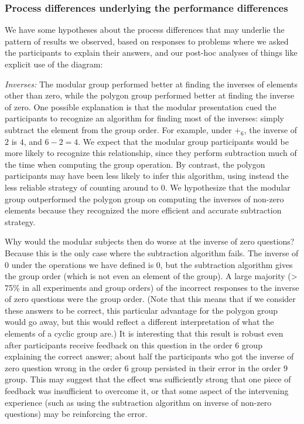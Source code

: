 \documentclass[man,mask,10pt]{apa6}
\begin{document}
\subsubsection{Process differences underlying the performance differences}
We have some hypotheses about the process differences that may underlie the pattern of results we observed, based on responses to problems where we asked the participants to explain their answers, and our post-hoc analyses of things like explicit use of the diagram:\par 
\textit{Inverses:} The modular group performed better at finding the inverses of elements other than zero, while the polygon group performed better at finding the inverse of zero. One possible explanation is that the modular presentation cued the participants to recognize an algorithm for finding most of the inverses: simply subtract the element from the group order. For example, under $+_6$, the inverse of $2$ is $4$, and $6-2 = 4$. We expect that the modular group participants would be more likely to recognize this relationship, since they perform subtraction much of the time when computing the group operation. By contrast, the polygon participants may have been less likely to infer this algorithm, using instead the less reliable strategy of counting around to 0. We hypothesize that the modular group outperformed the polygon group on computing the inverses of non-zero elements because they recognized the more efficient and accurate subtraction strategy. \par 
Why would the modular subjects then do worse at the inverse of zero questions? Because this is the only case where the subtraction algorithm fails. The inverse of 0 under the operations we have defined is 0, but the subtraction algorithm gives the group order (which is not even an element of the group). A large majority (> 75\% in all experiments and group orders) of the incorrect responses to the inverse of zero questions were the group order. (Note that this means that if we consider these answers to be correct, this particular advantage for the polygon group would go away, but this would reflect a different interpretation of what the elements of a cyclic group are.) It is interesting that this result is robust even after participants receive feedback on this question in the order 6 group explaining the correct answer; about half the participants who got the inverse of zero question wrong in the order 6 group persisted in their error in the order 9 group. This may suggest that the effect was sufficiently strong that one piece of feedback was insufficient to overcome it, or that some aspect of the intervening experience (such as using the subtraction algorithm on inverse of non-zero questions) may be reinforcing the error. \par
\end{document}
